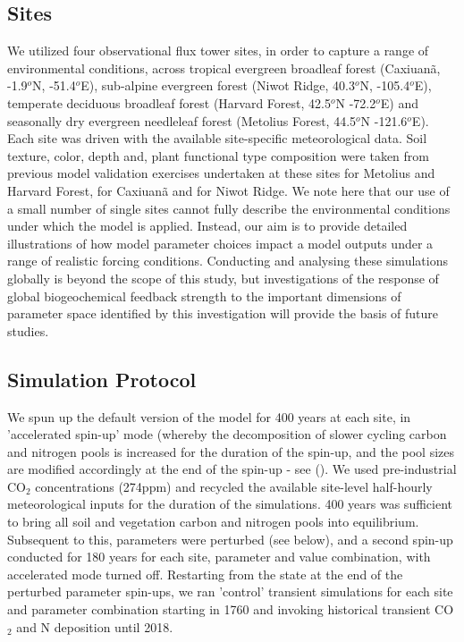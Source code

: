 \documentclass[draft,linenumbers]{agujournal}
\begin{document}
\subsection{Sites}
We utilized four observational flux tower sites, in order to capture a range of environmental conditions, across tropical evergreen broadleaf forest (Caxiuan\~a, -1.9$^{o}$N, -51.4$^{o}$E),  sub-alpine evergreen forest (Niwot Ridge, 40.3$^{o}$N, -105.4$^{o}$E), temperate deciduous broadleaf forest (Harvard Forest, 42.5$^{o}$N -72.2$^{o}$E) and seasonally dry evergreen needleleaf forest (Metolius Forest, 44.5$^{o}$N -121.6$^{o}$E).  Each site was driven with the available site-specific meteorological data. Soil texture, color, depth and, plant functional type composition were taken from previous model validation exercises undertaken at these sites \cite{bonan2012} for Metolius and Harvard Forest, \cite{fisher2007} for Caxiuan\~a and \cite{bonan2013} for Niwot Ridge.   We note here that our use of a small number of single sites cannot fully describe the environmental conditions under which the model is applied. Instead, our aim is to provide detailed illustrations of how model parameter choices impact a model outputs under a range of realistic forcing conditions. Conducting and analysing these simulations globally is beyond the scope of this study, but investigations of the response of global biogeochemical feedback strength to the important dimensions of parameter space identified by this investigation will provide the basis of future studies. 

\subsection{Simulation Protocol}
We spun up the default version of the model for 400 years at each site, in 'accelerated spin-up' mode (whereby the decomposition of slower cycling carbon and nitrogen pools is increased for the duration of the spin-up, and the pool sizes are modified accordingly at the end of the spin-up - see (\cite{lawrence2018}). We used pre-industrial CO$_{2}$ concentrations (274ppm) and recycled the available site-level half-hourly meteorological inputs for the duration of the simulations. 400 years was sufficient to bring all soil and vegetation carbon and nitrogen pools into equilibrium. Subsequent to this, parameters were perturbed (see below), and a second spin-up conducted for 180 years for each site, parameter and value combination, with accelerated mode turned off. Restarting from the state at the end of the perturbed parameter spin-ups, we ran 'control' transient simulations for each site and parameter combination starting in 1760 and invoking historical transient CO$_{2}$ and N deposition until 2018.
\end{document}
